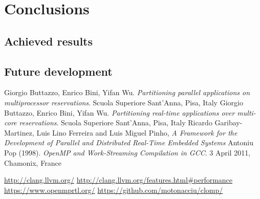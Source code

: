 \documentclass[a4paper,11pt,oneside]{book}
\begin{document}
\chapter{Conclusions}
\section{Achieved results}
\section{Future development}






\begin{thebibliography}{9}
 Giorgio Buttazzo, Enrico Bini, Yifan Wu. \emph{Partitioning parallel applications on multiprocessor reservations}. Scuola Superiore Sant’Anna, Pisa, Italy
 Giorgio Buttazzo, Enrico Bini, Yifan Wu. \emph{Partitioning real-time applications over multi-core reservations}. Scuola Superiore Sant’Anna, Pisa, Italy
 Ricardo Garibay-Martinez, Luis Lino Ferreira and Luis Miguel Pinho, \emph{A Framework for the Development of Parallel and Distributed Real-Time Embedded Systems}
Antoniu Pop (1998). \emph{OpenMP and Work-Streaming Compilation in GCC}. 3 April 2011, Chamonix, France

\url{http://clang.llvm.org/}
\url{http://clang.llvm.org/features.html\#performance}
\url{https://www.openmprtl.org/}
\url{https://github.com/motonacciu/clomp/}

\end{thebibliography}
\end{document}

